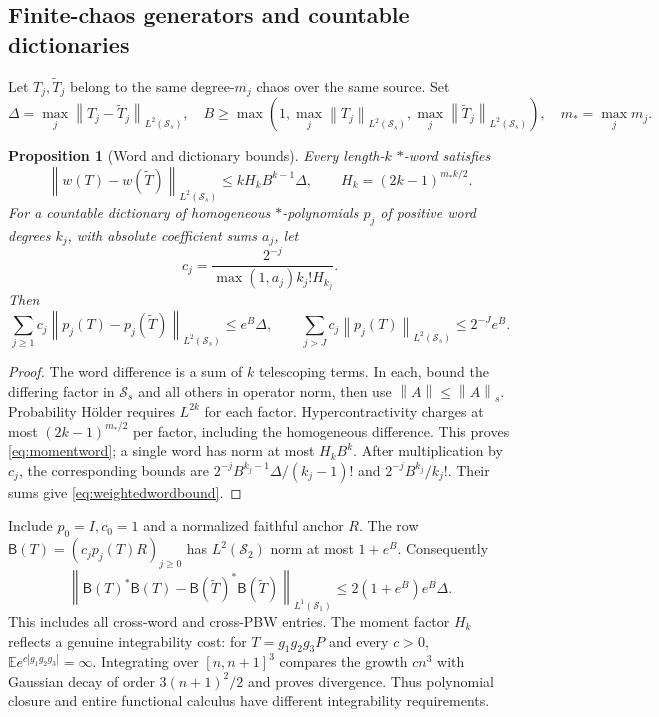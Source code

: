 \documentclass[11pt,a4paper]{amsart}
\numberwithin{equation}{section}
\newtheorem{proposition}[theorem]{Proposition}
\theoremstyle{definition}
\theoremstyle{remark}
\newcommand{\E}{\mathbb E}
\newcommand{\Sch}{\mathcal S}
\newcommand{\norm}[1]{\left\lVert#1\right\rVert}
\begin{document}
\subsection{Finite-chaos generators and countable dictionaries}
Let $T_j,\widetilde T_j$ belong to the same degree-$m_j$ chaos over the same source. Set
\[
 \Delta=\max_j\norm{T_j-\widetilde T_j}_{L^2(\Sch_s)},\quad
 B\ge\max\left(1,\max_j\norm{T_j}_{L^2(\Sch_s)},
                    \max_j\norm{\widetilde T_j}_{L^2(\Sch_s)}\right),
 \quad m_* =\max_jm_j.
\]
\begin{proposition}[Word and dictionary bounds]\label{prop:weightedwords}
Every length-$k$ $*$-word satisfies
\begin{equation}\label{eq:momentword}
 \norm{w(T)-w(\widetilde T)}_{L^2(\Sch_s)}
 \le kH_kB^{k-1}\Delta,\qquad H_k=(2k-1)^{m_*k/2}.
\end{equation}
For a countable dictionary of homogeneous $*$-polynomials $p_j$ of positive word degrees $k_j$, with absolute coefficient sums $a_j$, let
\[
 c_j=\frac{2^{-j}}{\max(1,a_j)k_j!H_{k_j}}.
\]
Then
\begin{equation}\label{eq:weightedwordbound}
 \sum_{j\ge1}c_j\norm{p_j(T)-p_j(\widetilde T)}_{L^2(\Sch_s)}\le e^B\Delta,
 \qquad
 \sum_{j>J}c_j\norm{p_j(T)}_{L^2(\Sch_s)}\le2^{-J}e^B.
\end{equation}
\end{proposition}
\begin{proof}
The word difference is a sum of $k$ telescoping terms. In each, bound the differing factor in $\Sch_s$ and all others in operator norm, then use $\norm A\le\norm A_s$. Probability H\"older requires $L^{2k}$ for each factor. Hypercontractivity charges at most $(2k-1)^{m_*/2}$ per factor, including the homogeneous difference. This proves \eqref{eq:momentword}; a single word has norm at most $H_kB^k$. After multiplication by $c_j$, the corresponding bounds are
$2^{-j}B^{k_j-1}\Delta/(k_j-1)!$ and $2^{-j}B^{k_j}/k_j!$.
Their sums give \eqref{eq:weightedwordbound}.
\end{proof}

Include $p_0=I,c_0=1$ and a normalized faithful anchor $R$. The row
$\mathsf B(T)=(c_jp_j(T)R)_{j\ge0}$
has $L^2(\Sch_2)$ norm at most $1+e^B$. Consequently
\begin{equation}\label{eq:allgramerror}
 \norm{\mathsf B(T)^*\mathsf B(T)-\mathsf B(\widetilde T)^*\mathsf B(\widetilde T)}_{L^1(\Sch_1)}
 \le2(1+e^B)e^B\Delta.
\end{equation}
This includes all cross-word and cross-PBW entries. The moment factor $H_k$ reflects a genuine integrability cost: for $T=g_1g_2g_3P$ and every $c>0$, $\E e^{c|g_1g_2g_3|}=\infty$. Integrating over $[n,n+1]^3$ compares the growth $cn^3$ with Gaussian decay of order $3(n+1)^2/2$ and proves divergence. Thus polynomial closure and entire functional calculus have different integrability requirements.
\end{document}
